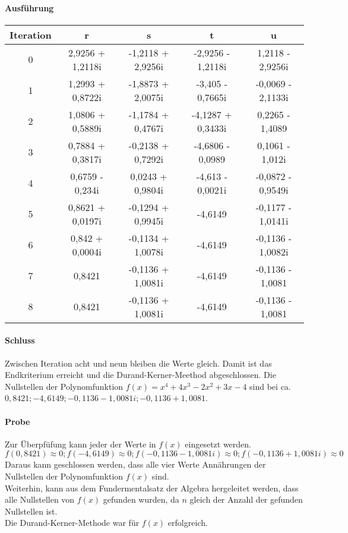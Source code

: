 \documentclass[12pt]{article}
\begin{document}
\paragraph{Ausführung}
\begin{center}
\begin{tabular}{c|c c c c}
    Iteration & r & s & t & u \\
    \hline
    0 & 2,9256 + 1,2118i & -1,2118 + 2,9256i & -2,9256 - 1,2118i & 1,2118 - 2,9256i \\
    1 & 1,2993 + 0,8722i & -1,8873 + 2,0075i & -3,405 - 0,7665i & -0,0069 - 2,1133i \\
    2 & 1,0806 + 0,5889i & -1,1784 + 0,4767i & -4,1287 + 0,3433i & 0,2265 - 1,4089 \\
    3 & 0,7884 + 0,3817i & -0,2138 + 0,7292i & -4,6806 - 0,0989 & 0,1061 - 1,012i \\
    4 & 0,6759 - 0,234i & 0,0243 + 0,9804i & -4,613 - 0,0021i & -0,0872 - 0,9549i \\
    5 & 0,8621 + 0,0197i & -0,1294 + 0,9945i & -4,6149 & -0,1177 - 1,0141i \\
    6 & 0,842 + 0,0004i & -0,1134 + 1,0078i & -4,6149 & -0,1136 - 1,0082i \\
    7 & 0,8421 & -0,1136 + 1,0081i & -4,6149 & -0,1136 - 1,0081 \\
    8 & 0,8421 & -0,1136 + 1,0081i & -4,6149 & -0,1136 - 1,0081 \\
\end{tabular}
\end{center}
\paragraph{Schluss}
Zwischen Iteration acht und neun bleiben die Werte gleich. Damit ist das Endkriterium erreicht und die Durand-Kerner-Meethod abgeschlossen. Die Nullstellen der Polynomfunktion $f(x) = x^4 + 4x^3 - 2x^2 + 3x - 4$ sind bei ca. $0,8421; -4,6149; -0,1136 - 1,0081i; -0,1136 + 1,0081$. 
\paragraph{Probe}
Zur Überpfüfung kann jeder der Werte in $f(x)$ eingesetzt werden.
\begin{displaymath}
    f(0,8421) \approx 0; f(-4,6149) \approx 0; f(-0,1136 - 1,0081i) \approx 0; f(-0,1136 + 1,0081i) \approx 0
\end{displaymath}
Daraus kann geschlossen werden, dass alle vier Werte Annährungen der Nullstellen der Polynomfunktion $f(x)$ sind. \\
Weiterhin, kann aus dem Fundermentalsatz der Algebra hergeleitet werden, dass alle Nullstellen von $f(x)$ gefunden wurden, da $n$ gleich der Anzahl der gefunden Nullstellen ist. \\
Die Durand-Kerner-Methode war für $f(x)$ erfolgreich.
\end{document}
